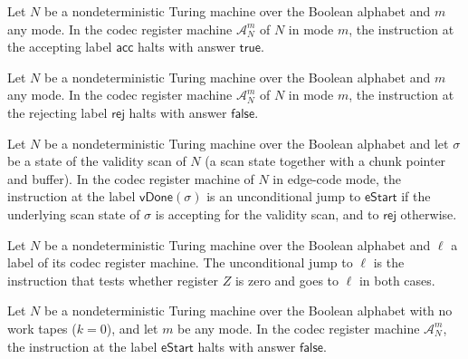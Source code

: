\begin{lemma}
\label{Complexity.Codec.CA_acc}
\leanok
{}
Let $N$ be a nondeterministic Turing machine over the Boolean alphabet and $m$ any mode.
In the codec register machine $\mathcal{A}^m_N$ of $N$ in mode $m$, the instruction at the
accepting label $\mathsf{acc}$ halts with answer $\mathsf{true}$.
\end{lemma}

\begin{lemma}
\label{Complexity.Codec.CA_rej}
\leanok
{}
Let $N$ be a nondeterministic Turing machine over the Boolean alphabet and $m$ any mode.
In the codec register machine $\mathcal{A}^m_N$ of $N$ in mode $m$, the instruction at the
rejecting label $\mathsf{rej}$ halts with answer $\mathsf{false}$.
\end{lemma}

\begin{lemma}
\label{Complexity.Codec.CA_vDone_edge}
\leanok
{}
Let $N$ be a nondeterministic Turing machine over the Boolean alphabet and let $\sigma$ be
a state of the validity scan of $N$ (a scan state together with a chunk pointer and
buffer). In the codec register machine of $N$ in edge-code mode, the instruction at the
label $\mathsf{vDone}(\sigma)$ is an unconditional jump to $\mathsf{eStart}$ if the
underlying scan state of $\sigma$ is accepting for the validity scan, and to
$\mathsf{rej}$ otherwise.
\end{lemma}

\begin{lemma}
\label{Complexity.Codec.goto_eq}
\leanok
{}
Let $N$ be a nondeterministic Turing machine over the Boolean alphabet and $\ell$ a label
of its codec register machine. The unconditional jump to $\ell$ is the instruction that
tests whether register $Z$ is zero and goes to $\ell$ in both cases.
\end{lemma}

\begin{lemma}
\label{Complexity.Codec.CA_eStart_of_zero}
\leanok
{}
Let $N$ be a nondeterministic Turing machine over the Boolean alphabet with no work tapes
($k = 0$), and let $m$ be any mode. In the codec register machine $\mathcal{A}^m_N$, the
instruction at the label $\mathsf{eStart}$ halts with answer $\mathsf{false}$.
\end{lemma}

